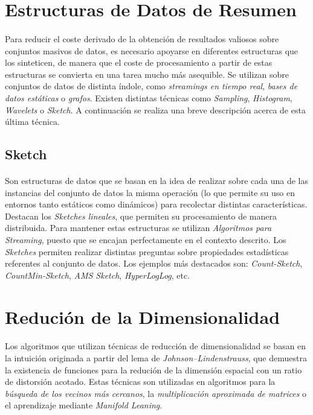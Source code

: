 \documentclass[a4paper]{article}
\begin{document}
  \section{Estructuras de Datos de Resumen}

    \paragraph{}
    Para reducir el coste derivado de la obtención de resultados valiosos sobre conjuntos masivos de datos, es necesario apoyarse en diferentes estructuras que los sinteticen, de manera que el coste de procesamiento a partir de estas estructuras se convierta en una tarea mucho más asequible. Se utilizan sobre conjuntos de datos de distinta índole, como \emph{streamings en tiempo real}, \emph{bases de datos estáticas} o \emph{grafos}. Existen distintas técnicas como \emph{Sampling}, \emph{Histogram}, \emph{Wavelets} o \emph{Sketch}. A continuación se realiza una breve descripción acerca de esta última técnica.

    \subsection{Sketch}

      \paragraph{}
      Son estructuras de datos que se basan en la idea de realizar sobre cada una de las instancias del conjunto de datos la misma operación (lo que permite su uso en entornos tanto estáticos como dinámicos) para recolectar distintas características. Destacan los \emph{Sketches lineales}, que permiten su procesamiento de manera distribuida. Para mantener estas estructuras se utilizan \emph{Algoritmos para Streaming}, puesto que se encajan perfectamente en el contexto descrito. Los \emph{Sketches} permiten realizar distintas preguntas sobre propiedades estadísticas referentes al conjunto de datos. Los ejemplos más destacados son: \emph{Count-Sketch}, \emph{CountMin-Sketch}, \emph{AMS Sketch}, \emph{HyperLogLog}, etc.

  \section{Redución de la Dimensionalidad}

    \paragraph{}
    Los algoritmos que utilizan técnicas de reducción de dimensionalidad se basan en la intuición originada a partir del lema de \emph{Johnson–Lindenstrauss}, que demuestra la existencia de funciones para la redución de la dimensión espacial con un ratio de distorsión acotado. Estas técnicas son utilizadas en algoritmos para la \emph{búsqueda de los vecinos más cercanos}, la \emph{multiplicación aproximada de matrices} o el aprendizaje mediante \emph{Manifold Leaning}.
\end{document}
